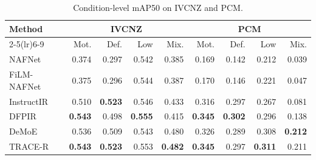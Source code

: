 \begin{table}[!t]
\centering
\caption{Condition-level mAP50 on IVCNZ and PCM.}
\label{tab:condition_results}
\footnotesize
\setlength{\tabcolsep}{3.7pt}
\begin{tabular}{lrrrrrrrr}
\toprule
Method & \multicolumn{4}{c}{IVCNZ} & \multicolumn{4}{c}{PCM} \\
\cmidrule(lr){2-5}\cmidrule(lr){6-9}
& Mot. & Def. & Low & Mix. & Mot. & Def. & Low & Mix. \\
\midrule
NAFNet & 0.374 & 0.297 & 0.542 & 0.385 & 0.169 & 0.142 & 0.212 & 0.039 \\
FiLM-NAFNet & 0.375 & 0.296 & 0.544 & 0.387 & 0.170 & 0.146 & 0.221 & 0.047 \\
InstructIR & 0.510 & \textbf{0.523} & 0.546 & 0.433 & 0.316 & 0.297 & 0.267 & 0.081 \\
DFPIR & \textbf{0.543} & 0.498 & \textbf{0.555} & 0.415 & \textbf{0.345} & \textbf{0.302} & 0.296 & 0.138 \\
DeMoE & 0.536 & 0.509 & 0.543 & 0.480 & 0.326 & 0.289 & 0.308 & \textbf{0.212} \\
TRACE-R & \textbf{0.543} & \textbf{0.523} & 0.553 & \textbf{0.482} & \textbf{0.345} & 0.297 & \textbf{0.311} & 0.211 \\
\bottomrule
\end{tabular}
\end{table}
